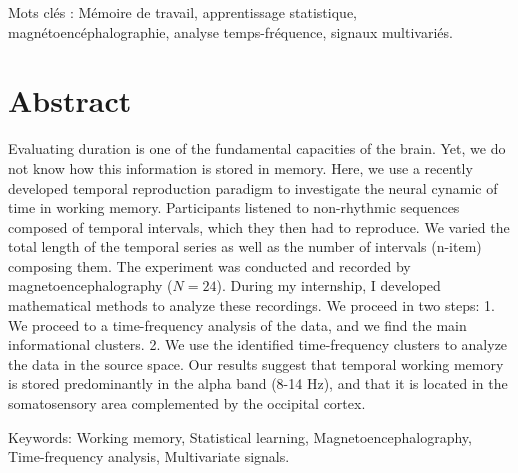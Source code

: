 Mots clés :
Mémoire de travail, apprentissage statistique, magnétoencéphalographie, analyse temps-fréquence, signaux multivariés.

\chapter*{\centering Abstract}

Evaluating duration is one of the fundamental capacities of the brain. Yet, we do not know how this information is stored in memory. Here, we use a recently developed temporal reproduction paradigm to investigate the neural cynamic of time in working memory. Participants listened to non-rhythmic sequences composed of temporal intervals, which they then had to reproduce. We varied the total length of the temporal series as well as the number of intervals (n-item) composing them. The experiment was conducted and recorded by magnetoencephalography ($N=24$). During my internship, I developed mathematical methods to analyze these recordings. We proceed in two steps: 1. We proceed to a time-frequency analysis of the data, and we find the main informational clusters. 2. We use the identified time-frequency clusters to analyze the data in the source space. Our results suggest that temporal working memory is stored predominantly in the alpha band (8-14 Hz), and that it is located in the somatosensory area complemented by the occipital cortex.

Keywords:
Working memory, Statistical learning, Magnetoencephalography, Time-frequency analysis, Multivariate signals.


